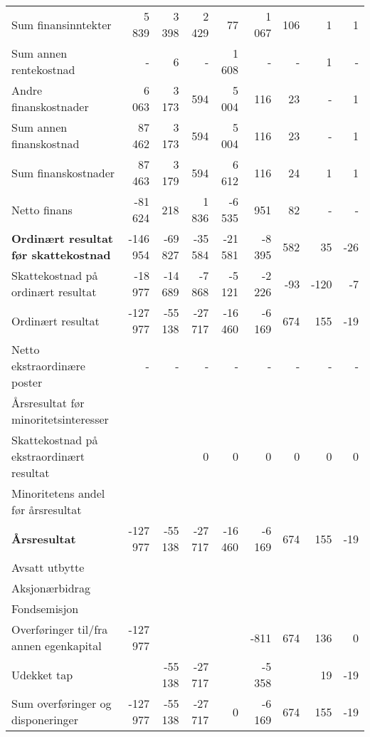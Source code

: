 \begin{table}[H]
\begin{tabular}{lrrrrrrrr}
Sum finansinntekter & 5 839 & 3 398 & 2 429 & 77 & 1 067 & 106 & 1 & 1 \\
Sum annen rentekostnad & - & 6 & - & 1 608 & - & - & 1 & - \\
Andre finanskostnader & 6 063 & 3 173 & 594 & 5 004 & 116 & 23 & - & 1 \\
Sum annen finanskostnad & 87 462 & 3 173 & 594 & 5 004 & 116 & 23 & - & 1 \\
Sum finanskostnader & 87 463 & 3 179 & 594 & 6 612 & 116 & 24 & 1 & 1 \\
Netto finans & -81 624 & 218 & 1 836 & -6 535 & 951 & 82 & - & - \\
\textbf{Ordinært resultat før skattekostnad} & -146 954 & -69 827 & -35 584 & -21 581 & -8 395 & 582 & 35 & -26 \\
\midrule
Skattekostnad på ordinært resultat & -18 977 & -14 689 & -7 868 & -5 121 & -2 226 & -93 & -120 & -7 \\
Ordinært resultat & -127 977 & -55 138 & -27 717 & -16 460 & -6 169 & 674 & 155 & -19 \\
Netto ekstraordinære poster & - & - & - & - & - & - & - & - \\
Årsresultat før minoritetsinteresser &  &  &  &  &  &  &  &  \\
Skattekostnad på ekstraordinært resultat &  &  & 0 & 0 & 0 & 0 & 0 & 0 \\
Minoritetens andel før årsresultat &  &  &  &  &  &  &  &  \\
\textbf{Årsresultat} & -127 977 & -55 138 & -27 717 & -16 460 & -6 169 & 674 & 155 & -19 \\
\midrule
Avsatt utbytte &  &  &  &  &  &  &  &  \\
Aksjonærbidrag &  &  &  &  &  &  &  &  \\
Fondsemisjon &  &  &  &  &  &  &  &  \\
Overføringer til/fra annen egenkapital & -127 977 &  &  &  & -811 & 674 & 136 & 0 \\
Udekket tap &  & -55 138 & -27 717 &  & -5 358 &  & 19 & -19 \\
Sum overføringer og disponeringer & -127 977 & -55 138 & -27 717 & 0 & -6 169 & 674 & 155 & -19\\
\bottomrule
\end{tabular}
\end{table}

